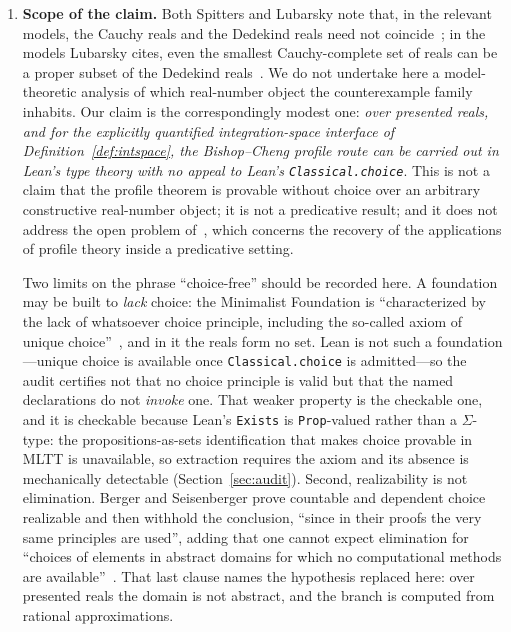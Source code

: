 \documentclass[11pt]{article}
\theoremstyle{definition}
\theoremstyle{remark}
\begin{document}
\begin{enumerate}[label=(\roman*)]
\item \textbf{Scope of the claim.}  Both Spitters and Lubarsky note that, in the relevant models, the Cauchy reals and the Dedekind reals need not coincide~\cite[\S2]{spitters-2006-dagstuhl}; in the models Lubarsky cites, even the smallest Cauchy-complete set of reals can be a proper subset of the Dedekind reals~\cite[\S7]{lubarsky-2007}.  We do not undertake here a model-theoretic analysis of which real-number object the counterexample family inhabits.  Our claim is the correspondingly modest one: \emph{over presented reals, and for the explicitly quantified integration-space interface of Definition~\ref{def:intspace}, the Bishop--Cheng profile route can be carried out in Lean's type theory with no appeal to Lean's \texttt{Classical.choice}}.  This is not a claim that the profile theorem is provable without choice over an arbitrary constructive real-number object; it is not a predicative result; and it does not address the open problem of~\cite{petrakis-zeuner-2024}, which concerns the recovery of the applications of profile theory inside a predicative setting.

Two limits on the phrase ``choice-free'' should be recorded here.  A foundation may be built to \emph{lack} choice: the Minimalist Foundation is ``characterized by the lack of whatsoever choice principle, including the so-called axiom of unique choice''~\cite[\S20.1]{maietti-sambin-2023}, and in it the reals form no set.  Lean is not such a foundation---unique choice is available once \texttt{Classical.choice} is admitted---so the audit certifies not that no choice principle is valid but that the named declarations do not \emph{invoke} one.  That weaker property is the checkable one, and it is checkable because Lean's \texttt{Exists} is \texttt{Prop}-valued rather than a $\Sigma$-type: the propositions-as-sets identification that makes choice provable in MLTT is unavailable, so extraction requires the axiom and its absence is mechanically detectable (Section~\ref{sec:audit}).  Second, realizability is not elimination.  Berger and Seisenberger prove countable and dependent choice realizable and then withhold the conclusion, ``since in their proofs the very same principles are used'', adding that one cannot expect elimination for ``choices of elements in abstract domains for which no computational methods are available''~\cite[\S29.3]{berger-seisenberger-2023}.  That last clause names the hypothesis replaced here: over presented reals the domain is not abstract, and the branch is computed from rational approximations.
\end{enumerate}
\end{document}
